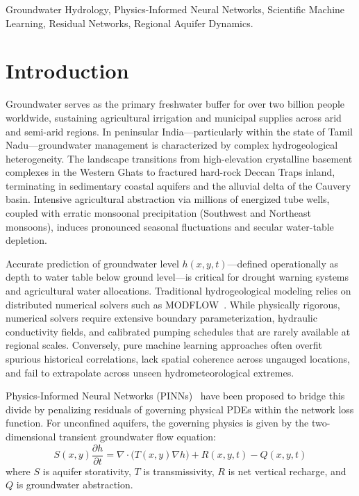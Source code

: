 \documentclass[10pt,conference,letterpaper]{IEEEtran}
\begin{document}
\begin{IEEEkeywords}
Groundwater Hydrology, Physics-Informed Neural Networks, Scientific Machine Learning, Residual Networks, Regional Aquifer Dynamics.
\end{IEEEkeywords}

\section{Introduction}
Groundwater serves as the primary freshwater buffer for over two billion people worldwide, sustaining agricultural irrigation and municipal supplies across arid and semi-arid regions. In peninsular India---particularly within the state of Tamil Nadu---groundwater management is characterized by complex hydrogeological heterogeneity. The landscape transitions from high-elevation crystalline basement complexes in the Western Ghats to fractured hard-rock Deccan Traps inland, terminating in sedimentary coastal aquifers and the alluvial delta of the Cauvery basin. Intensive agricultural abstraction via millions of energized tube wells, coupled with erratic monsoonal precipitation (Southwest and Northeast monsoons), induces pronounced seasonal fluctuations and secular water-table depletion.

Accurate prediction of groundwater level $h(x, y, t)$---defined operationally as depth to water table below ground level---is critical for drought warning systems and agricultural water allocations. Traditional hydrogeological modeling relies on distributed numerical solvers such as MODFLOW~\cite{mcdonald1988modular}. While physically rigorous, numerical solvers require extensive boundary parameterization, hydraulic conductivity fields, and calibrated pumping schedules that are rarely available at regional scales. Conversely, pure machine learning approaches often overfit spurious historical correlations, lack spatial coherence across ungauged locations, and fail to extrapolate across unseen hydrometeorological extremes.

Physics-Informed Neural Networks (PINNs)~\cite{raissi2019physics} have been proposed to bridge this divide by penalizing residuals of governing physical PDEs within the network loss function. For unconfined aquifers, the governing physics is given by the two-dimensional transient groundwater flow equation:
\begin{equation}
S(x, y) \frac{\partial h}{\partial t} = \nabla \cdot \big(T(x, y) \nabla h\big) + R(x, y, t) - Q(x, y, t)
\label{eq:pde_primary}
\end{equation}
where $S$ is aquifer storativity, $T$ is transmissivity, $R$ is net vertical recharge, and $Q$ is groundwater abstraction.
\end{document}
